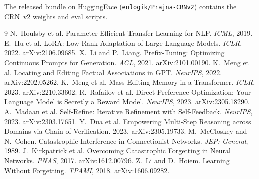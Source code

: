 \documentclass[11pt]{article}
\begin{document}
The released bundle on HuggingFace (\texttt{eulogik/Prajna-CRNv2}) contains the CRN~v2 weights and eval scripts.

\small
\begin{thebibliography}{9}
 N.~Houlsby et al. Parameter-Efficient Transfer Learning for NLP. \emph{ICML}, 2019.
 E.~Hu et al. LoRA: Low-Rank Adaptation of Large Language Models. \emph{ICLR}, 2022. arXiv:2106.09685.
 X.~Li and P.~Liang. Prefix-Tuning: Optimizing Continuous Prompts for Generation. \emph{ACL}, 2021. arXiv:2101.00190.
 K.~Meng et al. Locating and Editing Factual Associations in GPT. \emph{NeurIPS}, 2022. arXiv:2202.05262.
 K.~Meng et al. Mass-Editing Memory in a Transformer. \emph{ICLR}, 2023. arXiv:2210.33602.
 R.~Rafailov et al. Direct Preference Optimization: Your Language Model is Secretly a Reward Model. \emph{NeurIPS}, 2023. arXiv:2305.18290.
 A.~Madaan et al. Self-Refine: Iterative Refinement with Self-Feedback. \emph{NeurIPS}, 2023. arXiv:2303.17651.
 Y.~Dua et al. Empowering Multi-Step Reasoning across Domains via Chain-of-Verification. 2023. arXiv:2305.19733.
 M.~McCloskey and N.~Cohen. Catastrophic Interference in Connectionist Networks. \emph{JEP: General}, 1989.
 J.~Kirkpatrick et al. Overcoming Catastrophic Forgetting in Neural Networks. \emph{PNAS}, 2017. arXiv:1612.00796.
 Z.~Li and D.~Hoiem. Learning Without Forgetting. \emph{TPAMI}, 2018. arXiv:1606.09282.
\end{thebibliography}
\end{document}
